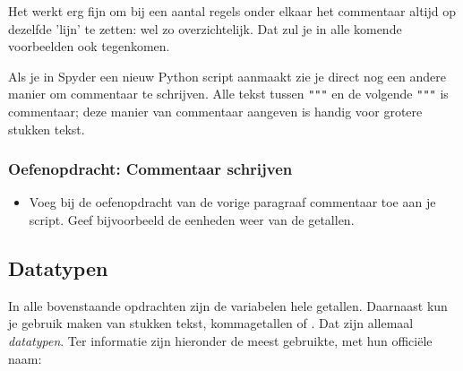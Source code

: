 \documentclass[a4paper,11pt, fleqn]{article}
\begin{document}
Het werkt erg fijn om bij een aantal regels onder elkaar het commentaar altijd op dezelfde 'lijn' te zetten: wel zo overzichtelijk. Dat zul je in alle komende voorbeelden ook tegenkomen.

Als je in Spyder een nieuw Python script aanmaakt zie je direct nog een andere manier om commentaar te schrijven. Alle tekst tussen \verb,""", en de volgende \verb,""", is commentaar; deze manier van commentaar aangeven is handig voor grotere stukken tekst. 

\subsubsection*{Oefenopdracht: Commentaar schrijven}
\begin{itemize}
	\item Voeg bij de oefenopdracht van de vorige paragraaf commentaar toe aan je script. Geef bijvoorbeeld de eenheden weer van de getallen.
\end{itemize}

\subsection{Datatypen}
In alle bovenstaande opdrachten zijn de variabelen hele getallen. Daarnaast kun je gebruik maken van stukken tekst, kommagetallen of . Dat zijn allemaal {\it datatypen}. Ter informatie zijn hieronder de meest gebruikte, met hun offici\"ele naam:
\end{document}
